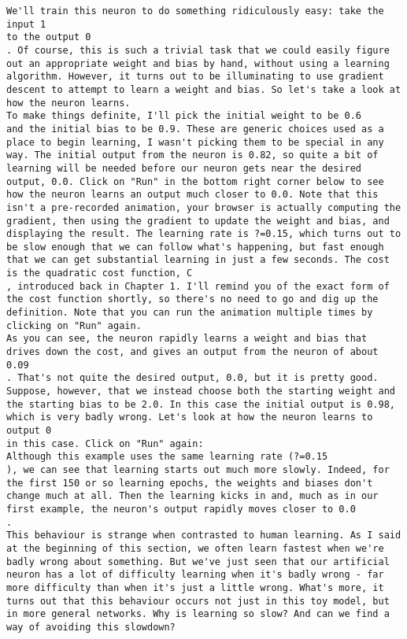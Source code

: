 \begin{lstlisting}
We'll train this neuron to do something ridiculously easy: take the input 1
to the output 0
. Of course, this is such a trivial task that we could easily figure out an appropriate weight and bias by hand, without using a learning algorithm. However, it turns out to be illuminating to use gradient descent to attempt to learn a weight and bias. So let's take a look at how the neuron learns.
To make things definite, I'll pick the initial weight to be 0.6
and the initial bias to be 0.9. These are generic choices used as a place to begin learning, I wasn't picking them to be special in any way. The initial output from the neuron is 0.82, so quite a bit of learning will be needed before our neuron gets near the desired output, 0.0. Click on "Run" in the bottom right corner below to see how the neuron learns an output much closer to 0.0. Note that this isn't a pre-recorded animation, your browser is actually computing the gradient, then using the gradient to update the weight and bias, and displaying the result. The learning rate is ?=0.15, which turns out to be slow enough that we can follow what's happening, but fast enough that we can get substantial learning in just a few seconds. The cost is the quadratic cost function, C
, introduced back in Chapter 1. I'll remind you of the exact form of the cost function shortly, so there's no need to go and dig up the definition. Note that you can run the animation multiple times by clicking on "Run" again.
As you can see, the neuron rapidly learns a weight and bias that drives down the cost, and gives an output from the neuron of about 0.09
. That's not quite the desired output, 0.0, but it is pretty good. Suppose, however, that we instead choose both the starting weight and the starting bias to be 2.0. In this case the initial output is 0.98, which is very badly wrong. Let's look at how the neuron learns to output 0
in this case. Click on "Run" again:
Although this example uses the same learning rate (?=0.15
), we can see that learning starts out much more slowly. Indeed, for the first 150 or so learning epochs, the weights and biases don't change much at all. Then the learning kicks in and, much as in our first example, the neuron's output rapidly moves closer to 0.0
.
This behaviour is strange when contrasted to human learning. As I said at the beginning of this section, we often learn fastest when we're badly wrong about something. But we've just seen that our artificial neuron has a lot of difficulty learning when it's badly wrong - far more difficulty than when it's just a little wrong. What's more, it turns out that this behaviour occurs not just in this toy model, but in more general networks. Why is learning so slow? And can we find a way of avoiding this slowdown?

\end{lstlisting}
